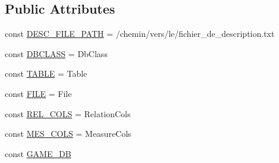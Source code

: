 \subsection*{Public Attributes}
\begin{DoxyCompactItemize}
\item 
const \hyperlink{class_analysis_a0c2610c8d837b3212cecf61585e96dfe}{D\+E\+S\+C\+\_\+\+F\+I\+L\+E\+\_\+\+P\+A\+TH} = \textquotesingle{}/chemin/vers/le/fichier\+\_\+de\+\_\+description.\+txt\textquotesingle{}
\item 
const \hyperlink{class_analysis_abebb77d53cda3d0d7177299907657723}{D\+B\+C\+L\+A\+SS} = \textquotesingle{}Db\+Class\textquotesingle{}
\item 
const \hyperlink{class_analysis_af2ef672d68e1361b2fc14dfd5ce0d63f}{T\+A\+B\+LE} = \textquotesingle{}Table\textquotesingle{}
\item 
const \hyperlink{class_analysis_a08c7b7b5ac0d24684338f5edca8c9268}{F\+I\+LE} = \textquotesingle{}File\textquotesingle{}
\item 
const \hyperlink{class_analysis_a8443e3fb309ae8e8442b162d5161eb2c}{R\+E\+L\+\_\+\+C\+O\+LS} = \textquotesingle{}Relation\+Cols\textquotesingle{}
\item 
const \hyperlink{class_analysis_a346bb11fddd93e2b0c7257dd838ead11}{M\+E\+S\+\_\+\+C\+O\+LS} = \textquotesingle{}Measure\+Cols\textquotesingle{}
\item 
const \hyperlink{class_analysis_ab3b63f8850456bd9000888c83182a296}{G\+A\+M\+E\+\_\+\+DB}
\end{DoxyCompactItemize}
